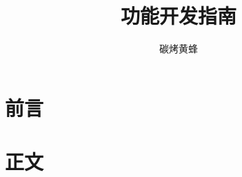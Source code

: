 \documentclass[chinese]{svmono}
\begin{document}
    \title{功能开发指南}
    \author{碳烤黄蜂}
    \maketitle

    \tableofcontents

    \frontmatter
    \chapter[前言]{前言}\label{ch:前言}
    

    \mainmatter
    \chapter[正文]{正文}\label{ch:正文}
    
    
\end{document}
